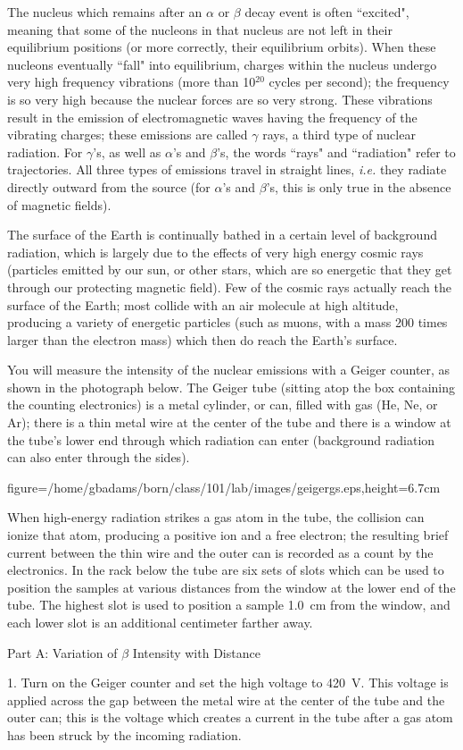     The nucleus which remains after an $\alpha$ or $\beta$
decay event is often ``excited", meaning that some of the 
nucleons in that nucleus are not left in their equilibrium 
positions (or more correctly, their equilibrium orbits).  
When these nucleons eventually ``fall" into equilibrium, 
charges within the nucleus undergo very high frequency 
vibrations (more than 10$^{20}$ cycles per second); the 
frequency is so very high because the nuclear forces are so 
very strong.  These vibrations result in the emission of 
electromagnetic waves having the frequency of the vibrating 
charges; these emissions are called $\gamma$ rays, a third 
type of nuclear radiation.  For $\gamma$'s, as well as
$\alpha$'s and $\beta$'s, the words ``rays" and ``radiation" 
refer to trajectories.  All three types of emissions travel 
in straight lines, {\it i.e.} they radiate directly outward 
from the source (for $\alpha$'s and $\beta$'s, this is only 
true in the absence of magnetic fields).

    The surface of the Earth is continually bathed in a
certain level of background radiation, which is largely
due to the effects of very high energy cosmic rays (particles
emitted by our sun, or other stars, which are so energetic
that they get through our protecting magnetic field).  Few
of the cosmic rays actually reach the surface of the Earth;
most collide with an air molecule at high altitude, producing 
a variety of energetic particles (such as muons, with a mass 
200 times larger than the electron mass) which then do reach 
the Earth's surface.
\vfil\eject
{}   

     You will measure the intensity of the nuclear
emissions with a Geiger counter, as shown in the photograph
below.  The Geiger tube (sitting atop the box containing the 
counting electronics) is a metal cylinder, or can, filled 
with gas (He, Ne, or Ar); there is a thin metal wire at the 
center of the tube and there is a window at the tube's lower 
end through which radiation can enter (background radiation 
can also enter through the sides).  
\bigskip
\centerline{\psfig
{figure=/home/gbadams/born/class/101/lab/images/geigergs.eps,height=6.7cm}}
\bigskip
\noindent When high-energy radiation 
strikes a gas atom in the tube, the collision can ionize that 
atom, producing a positive ion and a free electron; the resulting
brief current between the thin wire and the outer can is recorded 
as a count by the electronics.  In the rack below the tube are 
six sets of slots which can be used to position the samples at 
various distances from the window at the lower end of the tube.  
The highest slot is used to position a sample 1.0~cm from the 
window, and each lower slot is an additional centimeter farther 
away. 
\bigskip
\centerline{Part A: Variation of $\beta$ Intensity 
with Distance}
\smallskip
\item{1.} Turn on the Geiger counter and set the high voltage 
to 420~V.  This voltage is applied across the gap between the
metal wire at the center of the tube and the outer can; this
is the voltage which creates a current in the tube after a gas 
atom has been struck by the incoming radiation. 

